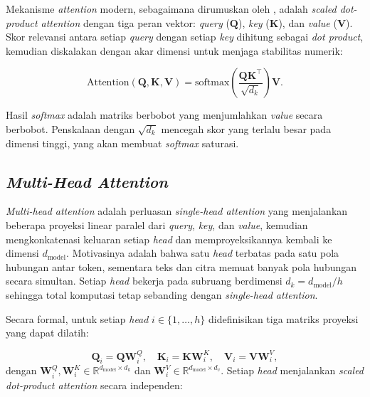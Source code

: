 Mekanisme \textit{attention} modern, sebagaimana dirumuskan oleh \citet{vaswaniAttentionAllYou2023}, adalah \textit{scaled dot-product attention} dengan tiga peran vektor: \textit{query} ($\mathbf{Q}$), \textit{key} ($\mathbf{K}$), dan \textit{value} ($\mathbf{V}$). Skor relevansi antara setiap \textit{query} dengan setiap \textit{key} dihitung sebagai \textit{dot product}, kemudian diskalakan dengan akar dimensi untuk menjaga stabilitas numerik:

\begin{equation}
    \text{Attention}(\mathbf{Q}, \mathbf{K}, \mathbf{V}) = \text{softmax}\!\left( \frac{\mathbf{Q} \mathbf{K}^\top}{\sqrt{d_k}} \right) \mathbf{V}.
    \label{eq:attention}
\end{equation}

Hasil \textit{softmax} adalah matriks berbobot yang menjumlahkan \textit{value} secara berbobot. Penskalaan dengan $\sqrt{d_k}$ mencegah skor yang terlalu besar pada dimensi tinggi, yang akan membuat \textit{softmax} saturasi.

\subsection{\textit{Multi-Head Attention}}

\textit{Multi-head attention} adalah perluasan \textit{single-head attention} yang menjalankan beberapa proyeksi linear paralel dari \textit{query}, \textit{key}, dan \textit{value}, kemudian mengkonkatenasi keluaran setiap \textit{head} dan memproyeksikannya kembali ke dimensi $d_{\text{model}}$. Motivasinya adalah bahwa satu \textit{head} terbatas pada satu pola hubungan antar token, sementara teks dan citra memuat banyak pola hubungan secara simultan. Setiap \textit{head} bekerja pada subruang berdimensi $d_k = d_{\text{model}}/h$ sehingga total komputasi tetap sebanding dengan \textit{single-head attention}.

Secara formal, untuk setiap \textit{head} $i \in \{1, \dots, h\}$ didefinisikan tiga matriks proyeksi yang dapat dilatih:

\begin{equation}
    \mathbf{Q}_i = \mathbf{Q} \mathbf{W}_i^Q, \quad
    \mathbf{K}_i = \mathbf{K} \mathbf{W}_i^K, \quad
    \mathbf{V}_i = \mathbf{V} \mathbf{W}_i^V,
    \label{eq:mha_proj}
\end{equation}
dengan $\mathbf{W}_i^Q, \mathbf{W}_i^K \in \mathbb{R}^{d_{\text{model}} \times d_k}$ dan $\mathbf{W}_i^V \in \mathbb{R}^{d_{\text{model}} \times d_v}$. Setiap \textit{head} menjalankan \textit{scaled dot-product attention} secara independen:


